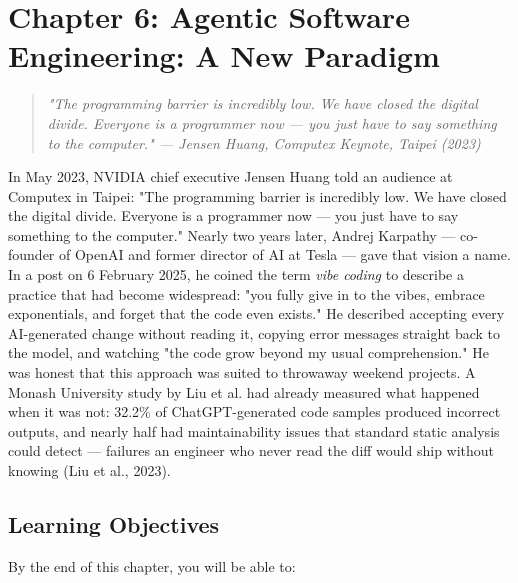 \documentclass[11pt,a4paper]{book}
\begin{document}

\chapter{Chapter 6: Agentic Software Engineering: A New Paradigm}

\begin{quote}
\textit{\textit{"The programming barrier is incredibly low. We have closed the digital divide. Everyone is a programmer now --- you just have to say something to the computer."} --- Jensen Huang, Computex Keynote, Taipei (2023)}
\end{quote}

\medskip

In May 2023, NVIDIA chief executive Jensen Huang told an audience at Computex in Taipei: "The programming barrier is incredibly low. We have closed the digital divide. Everyone is a programmer now --- you just have to say something to the computer." Nearly two years later, Andrej Karpathy --- co-founder of OpenAI and former director of AI at Tesla --- gave that vision a name. In a post on 6 February 2025, he coined the term \textit{vibe coding} to describe a practice that had become widespread: "you fully give in to the vibes, embrace exponentials, and forget that the code even exists." He described accepting every AI-generated change without reading it, copying error messages straight back to the model, and watching "the code grow beyond my usual comprehension." He was honest that this approach was suited to throwaway weekend projects. A Monash University study by Liu et al. had already measured what happened when it was not: 32.2\% of ChatGPT-generated code samples produced incorrect outputs, and nearly half had maintainability issues that standard static analysis could detect --- failures an engineer who never read the diff would ship without knowing (Liu et al., 2023).

\medskip

\section{Learning Objectives}

By the end of this chapter, you will be able to:
\end{document}
